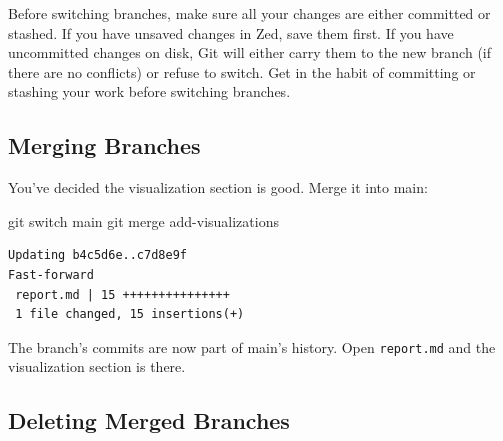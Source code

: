 \documentclass[
  letterpaper,
  DIV=11,
  numbers=noendperiod]{scrreprt}
\newenvironment{Shaded}{\begin{snugshade}}{\end{snugshade}}
\newcommand{\FunctionTok}[1]{\textcolor[rgb]{0.28,0.35,0.67}{#1}}
\newcommand{\NormalTok}[1]{\textcolor[rgb]{0.00,0.23,0.31}{#1}}
\begin{document}
\begin{tcolorbox}[enhanced jigsaw, opacitybacktitle=0.6, arc=.35mm, colback=white, bottomtitle=1mm, opacityback=0, toprule=.15mm, left=2mm, colbacktitle=quarto-callout-important-color!10!white, breakable, coltitle=black, toptitle=1mm, colframe=quarto-callout-important-color-frame, bottomrule=.15mm, titlerule=0mm, title=\textcolor{quarto-callout-important-color}{\faExclamation}\hspace{0.5em}{Save Before Switching Branches}, rightrule=.15mm, leftrule=.75mm]

Before switching branches, make sure all your changes are either
committed or stashed. If you have unsaved changes in Zed, save them
first. If you have uncommitted changes on disk, Git will either carry
them to the new branch (if there are no conflicts) or refuse to switch.
Get in the habit of committing or stashing your work before switching
branches.

\end{tcolorbox}

\subsection{Merging Branches}\label{merging-branches}

You've decided the visualization section is good. Merge it into main:

\begin{codelisting}

\caption{\texttt{terminal}}

\begin{Shaded}
\begin{Highlighting}[]
\FunctionTok{git}\NormalTok{ switch main}
\FunctionTok{git}\NormalTok{ merge add{-}visualizations}
\end{Highlighting}
\end{Shaded}

\end{codelisting}

\begin{verbatim}
Updating b4c5d6e..c7d8e9f
Fast-forward
 report.md | 15 +++++++++++++++
 1 file changed, 15 insertions(+)
\end{verbatim}

The branch's commits are now part of main's history. Open
\texttt{report.md} and the visualization section is there.

\subsection{Deleting Merged Branches}\label{deleting-merged-branches}
\end{document}

